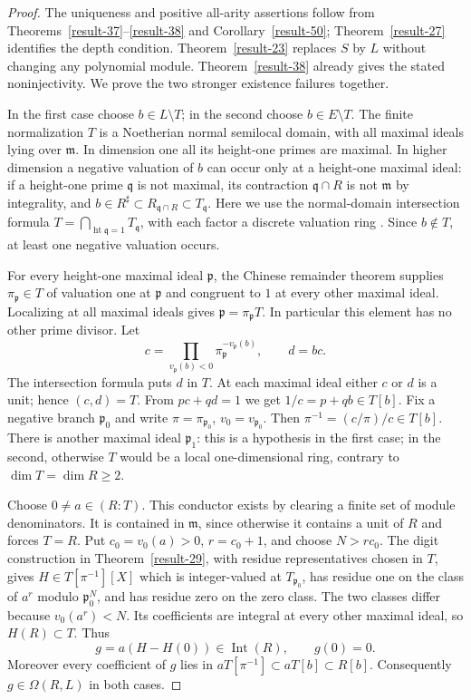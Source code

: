 \documentclass[11pt,a4paper]{article}
\theoremstyle{definition}
\begin{document}
\begin{proof}
The uniqueness and positive all-arity assertions follow from
Theorems~\ref{result-37}--\ref{result-38} and
Corollary~\ref{result-50}; Theorem~\ref{result-27} identifies the depth
condition. Theorem~\ref{result-23} replaces $S$ by $L$ without changing
any polynomial module. Theorem~\ref{result-38} already gives the stated
noninjectivity. We prove the two stronger existence failures together.

In the first case choose $b\in L\setminus T$; in the second choose
$b\in E\setminus T$. The finite normalization $T$ is a Noetherian
normal semilocal domain, with all maximal ideals lying over
$\mathfrak m$. In dimension one all its height-one primes are maximal.
In higher dimension a negative valuation of $b$ can occur only at a
height-one maximal ideal: if a height-one prime $\mathfrak q$ is not
maximal, its contraction $\mathfrak q\cap R$ is not $\mathfrak m$
by integrality, and
$b\in R^\sharp\subset R_{\mathfrak q\cap R}\subset T_{\mathfrak q}$.
Here we use the normal-domain intersection formula
$T=\bigcap_{\operatorname{ht}\mathfrak q=1}T_{\mathfrak q}$,
with each factor a discrete valuation ring
\cite[Section 10.157, Lemma 10.157.6, and Section 10.119]{StacksNormalDomains}.
Since $b\notin T$, at least one negative valuation occurs.

For every height-one maximal ideal $\mathfrak p$, the Chinese remainder
theorem supplies $\pi_{\mathfrak p}\in T$ of valuation one at
$\mathfrak p$ and congruent to $1$ at every other maximal ideal.
Localizing at all maximal ideals gives
$\mathfrak p=\pi_{\mathfrak p}T$. In particular this element has no
other prime divisor. Let
\[
 c=\prod_{v_{\mathfrak p}(b)<0}
             \pi_{\mathfrak p}^{-v_{\mathfrak p}(b)},\qquad d=bc.
\]
The intersection formula puts $d$ in $T$. At each maximal ideal either
$c$ or $d$ is a unit; hence $(c,d)=T$. From $pc+qd=1$ we get
$1/c=p+qb\in T[b]$. Fix a negative branch $\mathfrak p_0$ and write
$\pi=\pi_{\mathfrak p_0}$, $v_0=v_{\mathfrak p_0}$. Then
$\pi^{-1}=(c/\pi)/c\in T[b]$.
There is another maximal ideal $\mathfrak p_1$: this is a hypothesis
in the first case; in the second, otherwise $T$ would be a local
one-dimensional ring, contrary to $\dim T=\dim R\ge2$.

Choose $0\ne a\in (R:T)$. This conductor exists by clearing a finite
set of module denominators. It is contained in $\mathfrak m$, since
otherwise it contains a unit of $R$ and forces $T=R$. Put
$c_0=v_0(a)>0$, $r=c_0+1$, and choose $N>r c_0$.
The digit construction in Theorem~\ref{result-29}, with residue
representatives chosen in $T$, gives
$H\in T[\pi^{-1}][X]$ which is integer-valued at
$T_{\mathfrak p_0}$, has residue one on the class of $a^r$ modulo
$\mathfrak p_0^N$, and has residue zero on the zero class.
The two classes differ because $v_0(a^r)<N$. Its coefficients are
integral at every other maximal ideal, so $H(R)\subset T$. Thus
\[
 g=a(H-H(0))\in\operatorname{Int}(R),\qquad g(0)=0.
\]
Moreover every coefficient of $g$ lies in
$aT[\pi^{-1}]\subset aT[b]\subset R[b]$. Consequently
$g\in\Omega(R,L)$ in both cases.


\end{proof}
\end{document}

